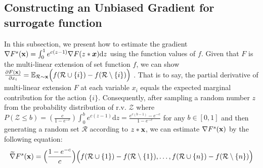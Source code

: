 \subsection{Constructing an Unbiased Gradient for surrogate function}\label{sec:construct_gradient_surrogate_function}
In this subsection, we present how to estimate the gradient $\nabla F^{s}(\mathbf{x})=\int_{0}^{1}e^{c(z-1)}\nabla F(z*\boldsymbol{x})\mathrm{d}z$ using the function values of $f$.
Given that  $F$ is the multi-linear extension of set function $f$, we can show $\frac{\partial F(\mathbf{x})}{\partial x_{i}}=\mathbb{E}_{\mathcal{R}\sim\mathbf{x}}\Big(f(\mathcal{R}\cup\{i\})-f(\mathcal{R}\setminus\{i\})\Big)$ \citep{calinescu2011maximizing}. That is to say, the partial derivative of multi-linear extension $F$ at each variable $x_{i}$ equals the expected marginal contribution for the action $\{i\}$. Consequently, after sampling a random number $z$ from the probability distribution of r.v. $\mathcal{Z}$ where $P(\mathcal{Z}\le b)=(\frac{c}{1-e^{-c}})\int_{0}^{b}e^{c(z-1)}\mathrm{d}z=\frac{e^{c(b-1)}-e^{-c}}{1-e^{-c}}$ for any $b\in[0,1]$ and then generating a random set $\mathcal{R}$ according to $z*\mathbf{x}$, we can estimate $\nabla F^{s}(\mathbf{x})$ by the following equation:
\vspace{-0.5em}
\begin{equation}\label{equ:gradient_surrogate}\widetilde{\nabla}F^{s}(\mathbf{x})=\Big(\frac{1-e^{-c}}{c}\Big)\Big(f(\mathcal{R}\cup\{1\})-f(\mathcal{R}\setminus\{1\}),\dots,f(\mathcal{R}\cup\{n\})-f(\mathcal{R}\setminus\{n\})\Big)
\end{equation}\vspace{-1.0em}